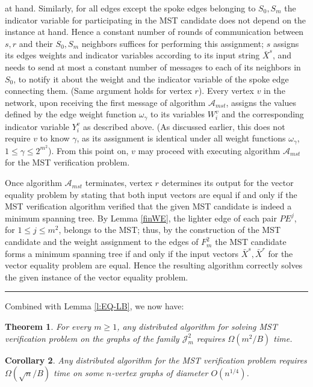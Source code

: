 \documentclass[11pt,letter]{article}
\def\cA{\mathcal{A}}
\def\cJ{\mathcal{J}}
\def\INPUT{\bar{X}^s,\bar{X}^r}
\def\INPUTS{\bar{X}^s}
\newtheorem{theorem}{Theorem}[section]
\newtheorem{corollary}[theorem]{Corollary}
\newcommand{\qed}{\rule{7pt}{7pt}}
\newenvironment{proof}{\noindent{\bf Proof}\hspace*{1em}}{\qed\bigskip}
\begin{document}
\begin{proof}
at hand. Similarly, for all edges except the spoke edges belonging to 
$S_0,S_m$ the indicator variable for participating in the MST candidate 
does not depend on the instance at hand.  Hence a constant number of rounds
of communication between $s,r$ and their  $S_0,S_m$ neighbors suffices 
for performing this assignment; $s$ assigns its edges weights and indicator 
variables according to its input string $\INPUTS$, and needs to send at most 
a constant number of messages to each of its neighbors in $S_0$, to notify it 
about the weight and the indicator variable of the spoke edge connecting them.
(Same argument holds for vertex $r$).
Every vertex $v$ in the network,
upon receiving the first message of algorithm $\cA_{mst}$, assigns the
values defined by the edge weight function $\omega_\gamma$ to its
variables $W_i^v$ and the corresponding indicator variable $Y_i^v$ 
as described above.
(As discussed earlier, this does not require $v$ to know $\gamma$, as
its assignment is identical under all weight functions $\omega_\gamma$,
$1 \le \gamma \le 2^{m^2}$).
From this point on, $v$ may proceed with executing algorithm
$\cA_{mst}$ for the MST verification problem.

Once algorithm $\cA_{mst}$ terminates,  vertex $r$ 
determines its output for the vector equality problem by stating that both input vectors are equal if and only if the MST verification algorithm verified that the given MST candidate is indeed a minimum spanning tree.
By Lemma \ref{finWE}, the lighter edge of each pair $PE^j$, for
$1\le j\le m^2$, belongs to the MST; 
thus, by the construction of the MST candidate and the weight assignment 
to the edges of $F^2_m$ the MST candidate forms a minimum spanning tree 
if and only if  the input vectors $\INPUT$ for the vector equality problem are equal.
Hence the resulting algorithm  correctly solves the given instance
of the vector equality  problem.
\end{proof}

Combined with Lemma \ref{l:EQ-LB}, we now have:
\begin{theorem}
For every $m \ge 1$, any distributed algorithm for solving  MST verification 
problem on the graphs of the family $\cJ_m^2$ 
requires $\Omega(m^2/B)$ time.
\end{theorem}

\begin{corollary}
\label{cl:sqrtn2}
Any distributed algorithm for the MST verification problem 
requires $\Omega(\sqrt{n}/B)$ time on
some $n$-vertex graphs of diameter $O(n^{1/4})$.
\end{corollary} 
\end{document}
